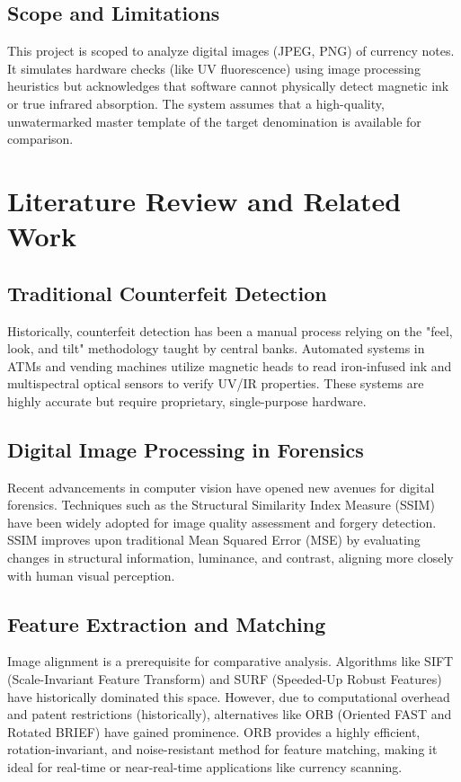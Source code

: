 \documentclass[12pt,a4paper]{article}
\begin{document}
\subsection{Scope and Limitations}
This project is scoped to analyze digital images (JPEG, PNG) of currency notes. It simulates hardware checks (like UV fluorescence) using image processing heuristics but acknowledges that software cannot physically detect magnetic ink or true infrared absorption. The system assumes that a high-quality, unwatermarked master template of the target denomination is available for comparison.

\newpage

\section{Literature Review and Related Work}

\subsection{Traditional Counterfeit Detection}
Historically, counterfeit detection has been a manual process relying on the "feel, look, and tilt" methodology taught by central banks. Automated systems in ATMs and vending machines utilize magnetic heads to read iron-infused ink and multispectral optical sensors to verify UV/IR properties. These systems are highly accurate but require proprietary, single-purpose hardware.

\subsection{Digital Image Processing in Forensics}
Recent advancements in computer vision have opened new avenues for digital forensics. Techniques such as the Structural Similarity Index Measure (SSIM) have been widely adopted for image quality assessment and forgery detection. SSIM improves upon traditional Mean Squared Error (MSE) by evaluating changes in structural information, luminance, and contrast, aligning more closely with human visual perception.

\subsection{Feature Extraction and Matching}
Image alignment is a prerequisite for comparative analysis. Algorithms like SIFT (Scale-Invariant Feature Transform) and SURF (Speeded-Up Robust Features) have historically dominated this space. However, due to computational overhead and patent restrictions (historically), alternatives like ORB (Oriented FAST and Rotated BRIEF) have gained prominence. ORB provides a highly efficient, rotation-invariant, and noise-resistant method for feature matching, making it ideal for real-time or near-real-time applications like currency scanning.
\end{document}
